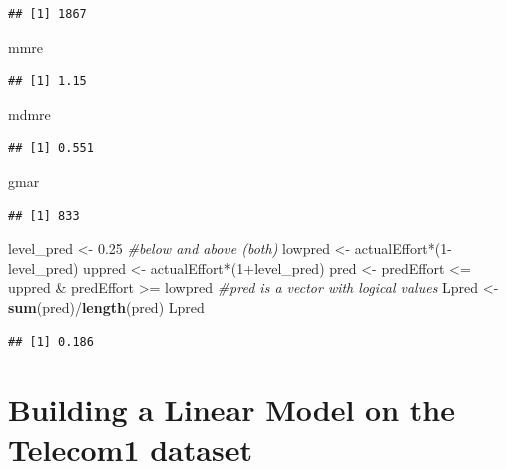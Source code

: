 \documentclass[]{book}
\newenvironment{Shaded}{\begin{snugshade}}{\end{snugshade}}
\newcommand{\KeywordTok}[1]{\textcolor[rgb]{0.13,0.29,0.53}{\textbf{{#1}}}}
\newcommand{\DecValTok}[1]{\textcolor[rgb]{0.00,0.00,0.81}{{#1}}}
\newcommand{\FloatTok}[1]{\textcolor[rgb]{0.00,0.00,0.81}{{#1}}}
\newcommand{\StringTok}[1]{\textcolor[rgb]{0.31,0.60,0.02}{{#1}}}
\newcommand{\CommentTok}[1]{\textcolor[rgb]{0.56,0.35,0.01}{\textit{{#1}}}}
\newcommand{\NormalTok}[1]{{#1}}
\begin{document}
\begin{verbatim}
## [1] 1867
\end{verbatim}

\begin{Shaded}
\begin{Highlighting}[]
\NormalTok{mmre}
\end{Highlighting}
\end{Shaded}

\begin{verbatim}
## [1] 1.15
\end{verbatim}

\begin{Shaded}
\begin{Highlighting}[]
\NormalTok{mdmre}
\end{Highlighting}
\end{Shaded}

\begin{verbatim}
## [1] 0.551
\end{verbatim}

\begin{Shaded}
\begin{Highlighting}[]
\NormalTok{gmar}
\end{Highlighting}
\end{Shaded}

\begin{verbatim}
## [1] 833
\end{verbatim}

\begin{Shaded}
\begin{Highlighting}[]
\NormalTok{level_pred <-}\StringTok{ }\FloatTok{0.25} \CommentTok{#below and above (both)}
\NormalTok{lowpred <-}\StringTok{ }\NormalTok{actualEffort*(}\DecValTok{1}\NormalTok{-level_pred)}
\NormalTok{uppred <-}\StringTok{  }\NormalTok{actualEffort*(}\DecValTok{1}\NormalTok{+level_pred)}
\NormalTok{pred  <-}\StringTok{  }\NormalTok{predEffort <=}\StringTok{ }\NormalTok{uppred &}\StringTok{ }\NormalTok{predEffort >=}\StringTok{ }\NormalTok{lowpred  }\CommentTok{#pred is a vector with logical values }
\NormalTok{Lpred <-}\StringTok{ }\KeywordTok{sum}\NormalTok{(pred)/}\KeywordTok{length}\NormalTok{(pred)}
\NormalTok{Lpred}
\end{Highlighting}
\end{Shaded}

\begin{verbatim}
## [1] 0.186
\end{verbatim}

\section{Building a Linear Model on the Telecom1
dataset}\label{building-a-linear-model-on-the-telecom1-dataset}
\end{document}
